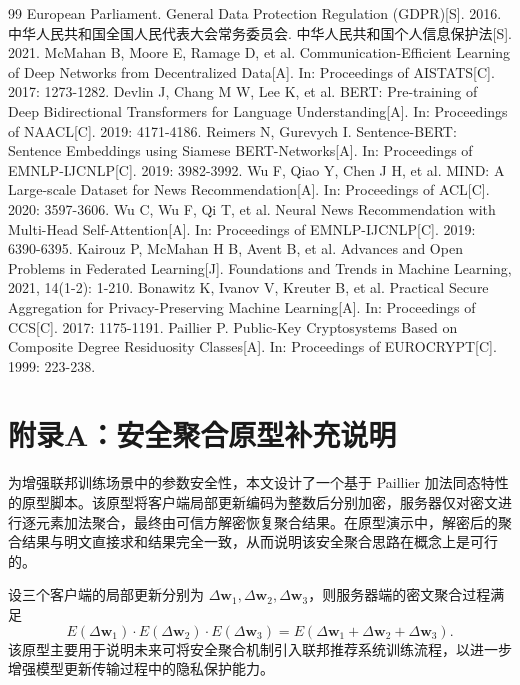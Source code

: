 \documentclass[UTF8,a4paper,12pt]{ctexart}
\numberwithin{equation}{section}
\begin{document}
\newpage
{}
\renewcommand\refname{参考文献}
\begin{thebibliography}{99}
\setlength{\itemsep}{0pt}
 European Parliament. General Data Protection Regulation (GDPR)[S]. 2016.
 中华人民共和国全国人民代表大会常务委员会. 中华人民共和国个人信息保护法[S]. 2021.
 McMahan B, Moore E, Ramage D, et al. Communication-Efficient Learning of Deep Networks from Decentralized Data[A]. In: Proceedings of AISTATS[C]. 2017: 1273-1282.
 Devlin J, Chang M W, Lee K, et al. BERT: Pre-training of Deep Bidirectional Transformers for Language Understanding[A]. In: Proceedings of NAACL[C]. 2019: 4171-4186.
 Reimers N, Gurevych I. Sentence-BERT: Sentence Embeddings using Siamese BERT-Networks[A]. In: Proceedings of EMNLP-IJCNLP[C]. 2019: 3982-3992.
 Wu F, Qiao Y, Chen J H, et al. MIND: A Large-scale Dataset for News Recommendation[A]. In: Proceedings of ACL[C]. 2020: 3597-3606.
 Wu C, Wu F, Qi T, et al. Neural News Recommendation with Multi-Head Self-Attention[A]. In: Proceedings of EMNLP-IJCNLP[C]. 2019: 6390-6395.
 Kairouz P, McMahan H B, Avent B, et al. Advances and Open Problems in Federated Learning[J]. Foundations and Trends in Machine Learning, 2021, 14(1-2): 1-210.
 Bonawitz K, Ivanov V, Kreuter B, et al. Practical Secure Aggregation for Privacy-Preserving Machine Learning[A]. In: Proceedings of CCS[C]. 2017: 1175-1191.
 Paillier P. Public-Key Cryptosystems Based on Composite Degree Residuosity Classes[A]. In: Proceedings of EUROCRYPT[C]. 1999: 223-238.
\end{thebibliography}

\newpage
{}
\section*{附录A：安全聚合原型补充说明}
为增强联邦训练场景中的参数安全性，本文设计了一个基于 Paillier 加法同态特性的原型脚本。该原型将客户端局部更新编码为整数后分别加密，服务器仅对密文进行逐元素加法聚合，最终由可信方解密恢复聚合结果。在原型演示中，解密后的聚合结果与明文直接求和结果完全一致，从而说明该安全聚合思路在概念上是可行的。

设三个客户端的局部更新分别为 $\Delta \mathbf{w}_1,\Delta \mathbf{w}_2,\Delta \mathbf{w}_3$，则服务器端的密文聚合过程满足
\begin{equation}
E(\Delta \mathbf{w}_1) \cdot E(\Delta \mathbf{w}_2) \cdot E(\Delta \mathbf{w}_3)=E(\Delta \mathbf{w}_1+\Delta \mathbf{w}_2+\Delta \mathbf{w}_3).
\end{equation}
该原型主要用于说明未来可将安全聚合机制引入联邦推荐系统训练流程，以进一步增强模型更新传输过程中的隐私保护能力。
\end{document}
